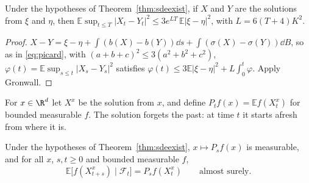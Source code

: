 \begin{proposition}\label{prop:sdeflow}
Under the hypotheses of Theorem~\ref{thm:sdeexist}, if $X$ and $Y$ are the solutions from $\xi$ and $\eta$, then $\mathbb E\sup_{t\le T}|X_t-Y_t|^2\le3e^{LT}\,\mathbb E|\xi-\eta|^2$, with $L=6(T+4)K^2$.
\end{proposition}

\begin{proof}
$X-Y=\xi-\eta+\int(b(X)-b(Y))\dd s+\int(\sigma(X)-\sigma(Y))\dd B$, so as in \eqref{eq:picard}, with $(a+b+c)^2\le3(a^2+b^2+c^2)$, $\varphi(t)=\mathbb E\sup_{s\le t}|X_s-Y_s|^2$ satisfies
$\varphi(t)\le3\mathbb E|\xi-\eta|^2+L\int_0^t\varphi$. Apply Gronwall.
\end{proof}

For $x\in\R^d$ let $X^x$ be the solution from $x$, and define $P_tf(x)=\mathbb Ef(X^x_t)$ for bounded measurable $f$. The solution forgets the past: at time $t$ it starts afresh from where it is.

\begin{theorem}\label{thm:sdemarkov}
Under the hypotheses of Theorem~\ref{thm:sdeexist}, $x\mapsto P_sf(x)$ is measurable, and for all $x$, $s,t\ge0$ and bounded measurable $f$,
\[
\mathbb E\bigl[f(X^x_{t+s})\mid \mathcal F_t\bigr]=P_sf(X^x_t)\qquad\text{almost surely.}
\]
\end{theorem}

